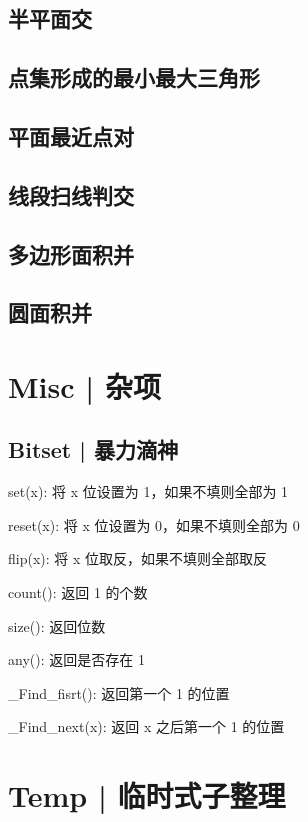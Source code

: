 \documentclass[8pt,a4paper]{article}
\newcommand{\code}[1]{
    
}
\newcommand{\txt}[1]{\par\noindent\footnotesize #1}
\begin{document}
\begin{multicols}{2}
    \subsection{半平面交}
        \code{src/computational_geometry/halfplane_intersection.cpp}
    \subsection{点集形成的最小最大三角形}
        \code{src/computational_geometry/minmax_triangle.cpp}
    \subsection{平面最近点对}
        \code{src/computational_geometry/closest_pair.cpp}
    \subsection{线段扫线判交}
        \code{src/computational_geometry/segment_sweep_intersection.cpp}
    \subsection{多边形面积并}
        \code{src/computational_geometry/polygon_union.cpp}
    \subsection{圆面积并}
        \code{src/computational_geometry/circle_union.cpp}

\section{Misc | 杂项}

    \subsection{Bitset | 暴力滴神}
        \txt{set(x): 将 x 位设置为 1，如果不填则全部为 1}
        \txt{reset(x): 将 x 位设置为 0，如果不填则全部为 0}
        \txt{flip(x): 将 x 位取反，如果不填则全部取反}
        \txt{count(): 返回 1 的个数}
        \txt{size(): 返回位数}
        \txt{any(): 返回是否存在 1}
        \txt{\_Find\_fisrt(): 返回第一个 1 的位置}
        \txt{\_Find\_next(x): 返回 x 之后第一个 1 的位置}

\section{Temp | 临时式子整理}


\end{multicols}
\end{document}
